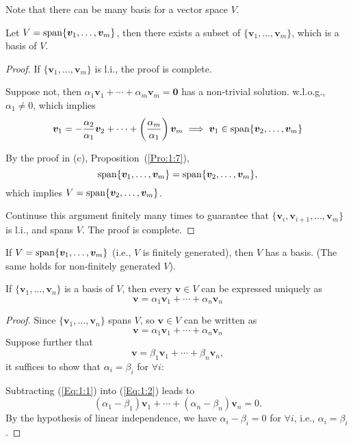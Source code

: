 \begin{remark}
Note that there can be many basis for a vector space $V$.
\end{remark}
\begin{proposition}
Let $V=\operatorname{span}\{\bm v_1,\dots,\bm v_m\}$, then there exists a subset of $\{\bm v_1,\dots,\bm v_m\}$, which is a basis of $V$.
\end{proposition}
\begin{proof}
If $\{\bm v_1,\dots,\bm v_m\}$ is l.i., the proof is complete.

Suppose not, then $\alpha_1\bm v_1+\cdots+\alpha_m\bm v_m=\bm0$ has a non-trivial solution. 
w.l.o.g., $\alpha_1\ne0$, which implies
\[
\bm v_1=-\frac{\alpha_2}{\alpha_1}\bm v_2+\cdots+\left(
\frac{\alpha_m}{\alpha_1}
\right)\bm v_m\implies
\bm v_1\in\operatorname{span}\{\bm v_2,\dots,\bm v_m\}
\]

By the proof in (c), Proposition~(\ref{Pro:1:7}),
\[
\operatorname{span}\{\bm v_1,\dots,\bm v_m\}=\operatorname{span}\{\bm v_2,\dots,\bm v_m\},
\]
which implies $V=\operatorname{span}\{\bm v_2,\dots,\bm v_m\}$.

Continuse this argument finitely many times to guarantee that $\{\bm v_i,\bm v_{i+1},\dots,\bm v_m\}$ is l.i., and spans $V$. The proof is complete.
\end{proof}

\begin{corollary}
If $V=\operatorname{span}\{\bm v_1,\dots,\bm v_m\}$ (i.e., $V$ is finitely generated), then $V$ has a basis. (The same holds for non-finitely generated $V$).
\end{corollary}
\begin{proposition}
If $\{\bm v_1,\dots,\bm v_n\}$ is a basis of $V$, then every $\bm v\in V$ can be expressed uniquely as
\[
\bm v=\alpha_1\bm v_1+\cdots+\alpha_n\bm v_n
\]
\end{proposition}
\begin{proof}
Since $\{\bm v_1,\dots,\bm v_n\}$ spans $V$, so $\bm v\in V$ can be written as
\begin{equation}\label{Eq:1:1}
\bm v=\alpha_1\bm v_1+\cdots+\alpha_n\bm v_n
\end{equation}
Suppose further that 
\begin{equation}\label{Eq:1:2}
\bm v=\beta_1\bm v_1+\cdots+\beta_n\bm v_n,
\end{equation}
it suffices to show that $\alpha_i=\beta_i$ for $\forall i$:

Subtracting (\ref{Eq:1:1}) into (\ref{Eq:1:2}) leads to
\[
(\alpha_1-\beta_1)\bm v_1+\cdots+(\alpha_n-\beta_n)\bm v_n=0.
\]
By the hypothesis of linear independence, we have $\alpha_i-\beta_i=0$ for $\forall i$, i.e., $\alpha_i=\beta_i$.
\end{proof}











